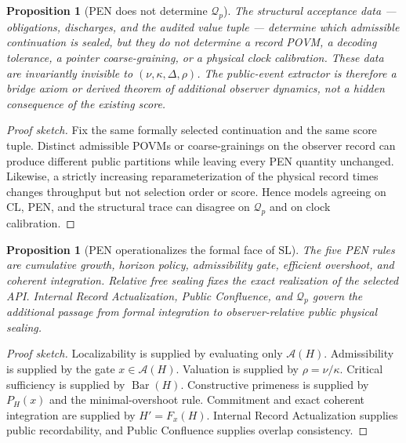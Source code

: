 \documentclass[11pt]{article}
\theoremstyle{plain}
\newtheorem{proposition}[theorem]{Proposition}
\theoremstyle{definition}
\theoremstyle{remark}
\newenvironment{proofsketch}{\begin{proof}[Proof sketch]}{\end{proof}}
\newcommand{\CL}{\mathrm{CL}}
\newcommand{\SLaw}{\mathrm{SL}}
\newcommand{\A}{\mathcal{A}}
\newcommand{\SelBar}{\operatorname{Bar}}
\begin{document}
\begin{proposition}[PEN does not determine \(\mathcal{Q}_p\)]
The structural acceptance data --- obligations, discharges, and the audited value tuple --- determine which admissible continuation is sealed, but they do not determine a record POVM, a decoding tolerance, a pointer coarse-graining, or a physical clock calibration. These data are invariantly invisible to \((\nu,\kappa,\Delta,\rho)\). The public-event extractor is therefore a bridge axiom or derived theorem of additional observer dynamics, not a hidden consequence of the existing score.
\end{proposition}

\begin{proofsketch}
Fix the same formally selected continuation and the same score tuple. Distinct admissible POVMs or coarse-grainings on the observer record can produce different public partitions while leaving every PEN quantity unchanged. Likewise, a strictly increasing reparameterization of the physical record times changes throughput but not selection order or score. Hence models agreeing on \(\CL\), PEN, and the structural trace can disagree on \(\mathcal{Q}_p\) and on clock calibration.
\end{proofsketch}

\begin{proposition}[PEN operationalizes the formal face of \(\SLaw\)]
The five PEN rules are cumulative growth, horizon policy, admissibility gate, efficient overshoot, and coherent integration. Relative free sealing fixes the exact realization of the selected API. Internal Record Actualization, Public Confluence, and \(\mathcal{Q}_p\) govern the additional passage from formal integration to observer-relative public physical sealing.
\end{proposition}

\begin{proofsketch}
Localizability is supplied by evaluating only \(\A(H)\). Admissibility is supplied by the gate \(x\in\A(H)\). Valuation is supplied by \(\rho=\nu/\kappa\). Critical sufficiency is supplied by \(\SelBar(H)\). Constructive primeness is supplied by \(P_H(x)\) and the minimal-overshoot rule. Commitment and exact coherent integration are supplied by \(H'=F_x(H)\). Internal Record Actualization supplies public recordability, and Public Confluence supplies overlap consistency.
\end{proofsketch}
\end{document}
